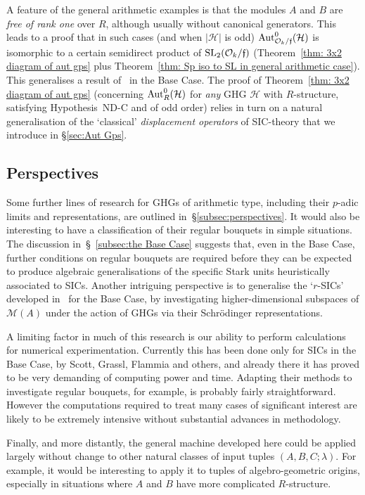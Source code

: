 \documentclass[12pt]{article}
\newcounter{example}[section]
\newcommand{\Aut}{{\rm Aut}}
\newcommand{\cH}{\ensuremath{\mathcal{H}}}
\newcommand{\cM}{\mathcal{M}}
\newcommand{\cO}{\ensuremath{\mathcal{O}}}
\newcommand{\ff}{\ensuremath{\mathfrak{f}}}
\newcommand{\SL}{{\rm SL}}
\begin{document}
A feature of the general arithmetic examples is that the modules $A$ and $B$ are \textit{free of rank one} over $R$, although usually without canonical generators. This leads to a proof that in such cases (and when $|\cH|$ is odd) $\Aut^0_{\cO_k/\ff}(\cH)$ is  isomorphic to 
a certain semidirect product of $\SL_2(\cO_k/\ff)$  (Theorem~\ref{thm: 3x2 diagram of aut gps} plus Theorem~\ref{thm: Sp iso to SL in general arithmetic case}). This generalises a result of~\cite{DMA: SICPOVMs and the ECG} in the Base Case. The proof of Theorem~\ref{thm: 3x2 diagram of aut gps}  (concerning $\Aut^0_{R}(\cH)$ for \textit{any} GHG $\cH$ with $R$-structure,  satisfying Hypothesis~ND-C and of odd order) relies in turn on a natural generalisation of the `classical'  \textit{displacement operators} of SIC-theory that we introduce in \S\ref{sec:Aut Gps}.   

\subsection{Perspectives}
Some further lines of research for GHGs of arithmetic type, including their $p$-adic limits and representations, are outlined in~\S\ref{subsec:perspectives}. It would also be interesting to have a classification of their regular bouquets in simple situations. The discussion in~\S~\ref{subsec:the Base Case} suggests that, even in the Base Case, further conditions on regular bouquets are required before they can be expected to produce algebraic generalisations of the specific Stark units heuristically associated to SICs. Another intriguing perspective is to generalise the `$r$-SICs' developed in~\cite{AFK constructive} for the Base Case, by investigating higher-dimensional subspaces of $\cM(A)$ under the action of GHGs via their Schr\"odinger representations. 

A limiting factor in much of this research is our ability 
to perform calculations for numerical experimentation. 
Currently this has been done only for SICs in the Base Case, by Scott, Grassl, Flammia and others, and already there it has proved to be very  demanding of computing power and time. Adapting their methods to investigate regular bouquets, for example, is probably fairly straightforward. However the computations required to treat many cases of significant interest are likely to be extremely intensive without substantial advances in methodology. 

Finally, and more distantly, the general machine developed here could be applied largely without change to  other natural classes of input tuples $(A,B,C;\lambda)$. For example, it would be interesting to apply it to tuples of algebro-geometric origins, especially in situations where $A$ and $B$ have more complicated $R$-structure.  
\end{document}
